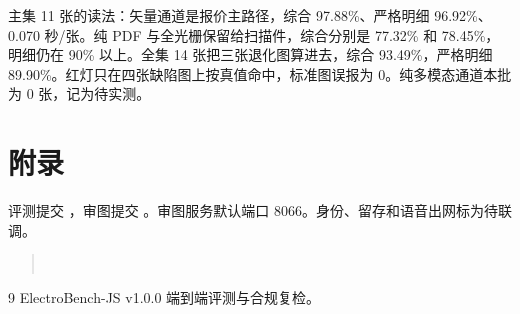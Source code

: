 主集 11 张的读法：矢量通道是报价主路径，综合 97.88\%、严格明细 96.92\%、0.070 秒/张。纯 PDF 与全光栅保留给扫描件，综合分别是 77.32\% 和 78.45\%，明细仍在 90\% 以上。全集 14 张把三张退化图算进去，综合 93.49\%，严格明细 89.90\%。红灯只在四张缺陷图上按真值命中，标准图误报为 0。纯多模态通道本批为 0 张，记为待实测。

\clearpage
\section{附录}
评测提交 ，审图提交 。审图服务默认端口 8066。身份、留存和语音出网标为待联调。

\begin{quote}\small
{}\\
\end{quote}

\begin{thebibliography}{9}
 ElectroBench-JS v1.0.0 端到端评测与合规复检。
\end{thebibliography}

